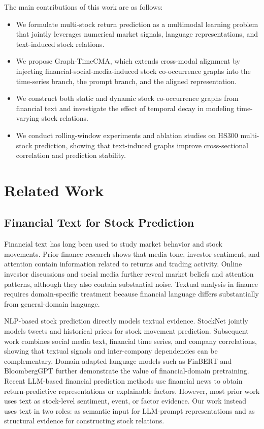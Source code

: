 The main contributions of this work are as follows:
\begin{itemize}
    \item We formulate multi-stock return prediction as a multimodal learning problem that jointly leverages numerical market signals, language representations, and text-induced stock relations.
    \item We propose Graph-TimeCMA, which extends cross-modal alignment by injecting financial-social-media-induced stock co-occurrence graphs into the time-series branch, the prompt branch, and the aligned representation.
    \item We construct both static and dynamic stock co-occurrence graphs from financial text and investigate the effect of temporal decay in modeling time-varying stock relations.
    \item We conduct rolling-window experiments and ablation studies on HS300 multi-stock prediction, showing that text-induced graphs improve cross-sectional correlation and prediction stability.
\end{itemize}

\section{Related Work}

\subsection{Financial Text for Stock Prediction}

Financial text has long been used to study market behavior and stock movements. Prior finance research shows that media tone, investor sentiment, and attention contain information related to returns and trading activity. Online investor discussions and social media further reveal market beliefs and attention patterns, although they also contain substantial noise. Textual analysis in finance requires domain-specific treatment because financial language differs substantially from general-domain language.

NLP-based stock prediction directly models textual evidence. StockNet jointly models tweets and historical prices for stock movement prediction. Subsequent work combines social media text, financial time series, and company correlations, showing that textual signals and inter-company dependencies can be complementary. Domain-adapted language models such as FinBERT and BloombergGPT further demonstrate the value of financial-domain pretraining. Recent LLM-based financial prediction methods use financial news to obtain return-predictive representations or explainable factors. However, most prior work uses text as stock-level sentiment, event, or factor evidence. Our work instead uses text in two roles: as semantic input for LLM-prompt representations and as structural evidence for constructing stock relations.

